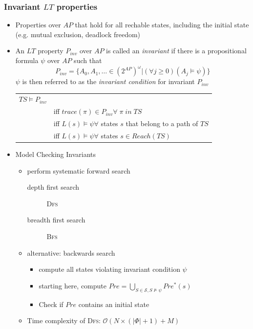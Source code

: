 \documentclass[a4paper, 10pt]{article}
\begin{document}
\subsubsection*{Invariant $LT$ properties}
\begin{itemize}
    \item Properties over $AP$ that hold for all rechable states, including the initial state (e.g. mutual exclusion, deadlock freedom)
    \item
    \begin{shaded}
        An $LT$ property $P_{inv}$ over $AP$ is called an \emph{invariant} if there is a propositional formula $\psi$ over $AP$ such that
        \[ P_{inv} = \{ A_0,A_1,\dots\in (2^{AP})^\omega | (\forall j\geq0)(A_j\models\psi) \} \]
        $\psi$ is then referred to as the \emph{invariant condition} for invariant $P_{inv}$
    \end{shaded}
    \begin{tabular}[t]{ll}
    $TS\models P_{inv}$ & \\
    & iff $trace(\pi)\in P_{inv}\forall \; \pi \; in \; TS$ \\
    & iff $L(s)\models\psi\forall$ states $s$ that belong to a path of $TS$ \\
    & iff $L(s)\models\psi\forall$ states $s\in Reach(TS)$
    \end{tabular}
    \item Model Checking Invariants
    \begin{itemize}
        \item perform systematic forward search
        \begin{description}
            \item[depth first search] \textsc{Dfs}
            \item[breadth first search] \textsc{Bfs}
        \end{description}
        \item alternative: backwards search
        \begin{itemize}
            \item compute all states violating invariant condition $\psi$
            \item starting here, compute $Pre=\bigcup_{S\in\mathcal{S},S\not\models\psi}Pre^*(s)$
            \item Check if $Pre$ contains an initial state
        \end{itemize}
        \item Time complexity of \textsc{Dfs}: $\mathcal{O}(N\times(|\Phi|+1)+M)$

\end{itemize}
\end{itemize}
\end{document}
